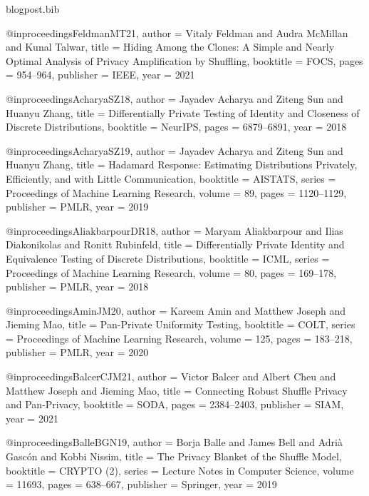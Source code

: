 \documentclass[11pt]{article}
\begin{document}
\begin{filecontents*}{blogpost.bib}

@inproceedings{FeldmanMT21,
  author    = {Vitaly Feldman and
               Audra McMillan and
               Kunal Talwar},
  title     = {Hiding Among the Clones: {A} Simple and Nearly Optimal Analysis of
               Privacy Amplification by Shuffling},
  booktitle = {{FOCS}},
  pages     = {954--964},
  publisher = {{IEEE}},
  year      = {2021}
}

@inproceedings{AcharyaSZ18,
  author    = {Jayadev Acharya and
               Ziteng Sun and
               Huanyu Zhang},
  title     = {Differentially Private Testing of Identity and Closeness of Discrete
               Distributions},
  booktitle = {NeurIPS},
  pages     = {6879--6891},
  year      = {2018}
}

@inproceedings{AcharyaSZ19,
  author    = {Jayadev Acharya and
               Ziteng Sun and
               Huanyu Zhang},
  title     = {Hadamard Response: Estimating Distributions Privately, Efficiently,
               and with Little Communication},
  booktitle = {{AISTATS}},
  series    = {Proceedings of Machine Learning Research},
  volume    = {89},
  pages     = {1120--1129},
  publisher = {{PMLR}},
  year      = {2019}
}

@inproceedings{AliakbarpourDR18,
  author    = {Maryam Aliakbarpour and
               Ilias Diakonikolas and
               Ronitt Rubinfeld},
  title     = {Differentially Private Identity and Equivalence Testing of Discrete
               Distributions},
  booktitle = {{ICML}},
  series    = {Proceedings of Machine Learning Research},
  volume    = {80},
  pages     = {169--178},
  publisher = {{PMLR}},
  year      = {2018}
}

@inproceedings{AminJM20,
  author    = {Kareem Amin and
               Matthew Joseph and
               Jieming Mao},
  title     = {Pan-Private Uniformity Testing},
  booktitle = {{COLT}},
  series    = {Proceedings of Machine Learning Research},
  volume    = {125},
  pages     = {183--218},
  publisher = {{PMLR}},
  year      = {2020}
}

@inproceedings{BalcerCJM21,
  author    = {Victor Balcer and
               Albert Cheu and
               Matthew Joseph and
               Jieming Mao},
  title     = {Connecting Robust Shuffle Privacy and Pan-Privacy},
  booktitle = {{SODA}},
  pages     = {2384--2403},
  publisher = {{SIAM}},
  year      = {2021}
}

@inproceedings{BalleBGN19,
  author    = {Borja Balle and
               James Bell and
               Adri{\`{a}} Gasc{\'{o}}n and
               Kobbi Nissim},
  title     = {The Privacy Blanket of the Shuffle Model},
  booktitle = {{CRYPTO} {(2)}},
  series    = {Lecture Notes in Computer Science},
  volume    = {11693},
  pages     = {638--667},
  publisher = {Springer},
  year      = {2019}
}


\end{filecontents*}
\end{document}
